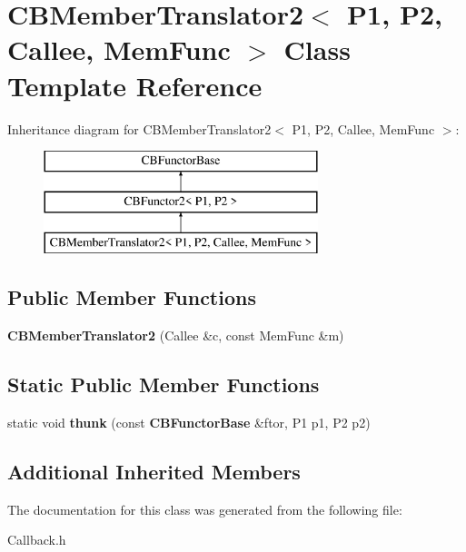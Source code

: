 \section{C\+B\+Member\+Translator2$<$ P1, P2, Callee, Mem\+Func $>$ Class Template Reference}
\label{classCBMemberTranslator2}
Inheritance diagram for C\+B\+Member\+Translator2$<$ P1, P2, Callee, Mem\+Func $>$\+:\begin{figure}[H]
\begin{center}
\leavevmode
\includegraphics[height=3.000000cm]{classCBMemberTranslator2}
\end{center}
\end{figure}
\subsection*{Public Member Functions}
\begin{DoxyCompactItemize}
\item 
{\bfseries C\+B\+Member\+Translator2} (Callee \&c, const Mem\+Func \&m)\label{classCBMemberTranslator2_af8ffe32f73ed778d2f232a08127dc4cc}

\end{DoxyCompactItemize}
\subsection*{Static Public Member Functions}
\begin{DoxyCompactItemize}
\item 
static void {\bfseries thunk} (const {\bf C\+B\+Functor\+Base} \&ftor, P1 p1, P2 p2)\label{classCBMemberTranslator2_aaf39115b5d5157229b06a8be0e413b5d}

\end{DoxyCompactItemize}
\subsection*{Additional Inherited Members}


The documentation for this class was generated from the following file\+:\begin{DoxyCompactItemize}
\item 
Callback.\+h\end{DoxyCompactItemize}
